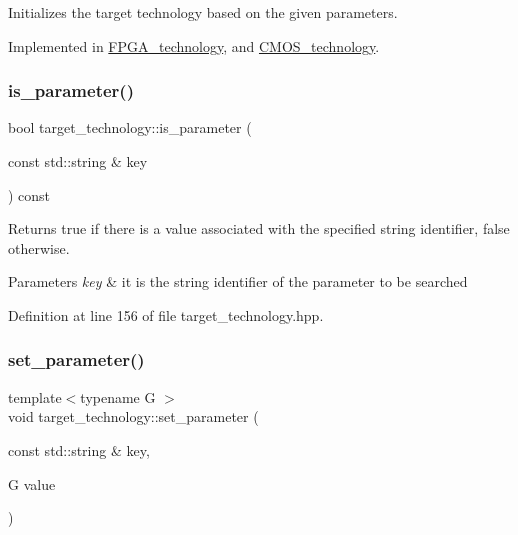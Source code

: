 Initializes the target technology based on the given parameters. 



Implemented in \hyperlink{classFPGA__technology_ae30c5de6f7aeb8b2e43d668a6c9ea774}{F\+P\+G\+A\+\_\+technology}, and \hyperlink{classCMOS__technology_af6aed0f6dc8bf72c8914a14c00b949a7}{C\+M\+O\+S\+\_\+technology}.

\mbox{\label{classtarget__technology_a01f34071b310808b080a0bb8db41ea3f}} 
\subsubsection{\texorpdfstring{is\+\_\+parameter()}{is\_parameter()}}
{\footnotesize\ttfamily bool target\+\_\+technology\+::is\+\_\+parameter (\begin{DoxyParamCaption}\item[{const std\+::string \&}]{key }\end{DoxyParamCaption}) const\hspace{0.3cm}{\ttfamily [inline]}}



Returns true if there is a value associated with the specified string identifier, false otherwise. 


\begin{DoxyParams}{Parameters}
{\em key} & it is the string identifier of the parameter to be searched \\
\hline
\end{DoxyParams}


Definition at line 156 of file target\+\_\+technology.\+hpp.

\mbox{\label{classtarget__technology_a5ab437ee434569815da739feae3785bc}} 
\subsubsection{\texorpdfstring{set\+\_\+parameter()}{set\_parameter()}}
{\footnotesize\ttfamily template$<$typename G $>$ \\
void target\+\_\+technology\+::set\+\_\+parameter (\begin{DoxyParamCaption}\item[{const std\+::string \&}]{key,  }\item[{G}]{value }\end{DoxyParamCaption})\hspace{0.3cm}{\ttfamily [inline]}}



